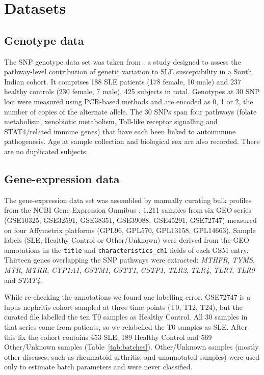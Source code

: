 \documentclass[11pt]{article}
\begin{document}
\section{Datasets}

\subsection{Genotype data}
The SNP genotype data set was taken from \citet{rupasree2016}, a study designed to assess the pathway-level contribution of genetic variation to SLE susceptibility in a South Indian cohort. It comprises 188 SLE patients (178 female, 10 male) and 237 healthy controls (230 female, 7 male), 425 subjects in total. Genotypes at 30 SNP loci were measured using PCR-based methods and are encoded as 0, 1 or 2, the number of copies of the alternate allele. The 30 SNPs span four pathways (folate metabolism, xenobiotic metabolism, Toll-like receptor signalling and STAT4/related immune genes) that have each been linked to autoimmune pathogenesis. Age at sample collection and biological sex are also recorded. There are no duplicated subjects.

\subsection{Gene-expression data}
The gene-expression data set was assembled by manually curating bulk profiles from the NCBI Gene Expression Omnibus \citep{barrett2013}: 1,211 samples from six GEO series (GSE10325, GSE32591, GSE38351, GSE39088, GSE45291, GSE72747) measured on four Affymetrix platforms (GPL96, GPL570, GPL13158, GPL14663). Sample labels (SLE, Healthy Control or Other/Unknown) were derived from the GEO annotations in the \texttt{title} and \texttt{characteristics\_ch1} fields of each GSM entry. Thirteen genes overlapping the SNP pathways were extracted: \textit{MTHFR}, \textit{TYMS}, \textit{MTR}, \textit{MTRR}, \textit{CYP1A1}, \textit{GSTM1}, \textit{GSTT1}, \textit{GSTP1}, \textit{TLR2}, \textit{TLR4}, \textit{TLR7}, \textit{TLR9} and \textit{STAT4}.

While re-checking the annotations we found one labelling error. GSE72747 is a lupus nephritis cohort sampled at three time points (T0, T12, T24), but the curated file labelled the ten T0 samples as Healthy Control. All 30 samples in that series come from patients, so we relabelled the T0 samples as SLE. After this fix the cohort contains 453 SLE, 189 Healthy Control and 569 Other/Unknown samples (Table~\ref{tab:batches}). Other/Unknown samples (mostly other diseases, such as rheumatoid arthritis, and unannotated samples) were used only to estimate batch parameters and were never classified.
\end{document}
